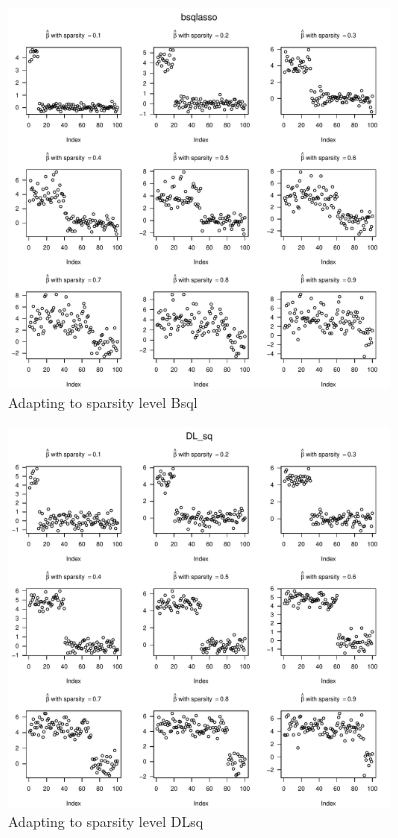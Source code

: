 \documentclass[chapters]{uamaththesis}
\begin{document}
\begin{figure}[!h]%
\centering
\includegraphics[width=0.9\textwidth , height = .8\textheight]{Sparsity_Bsql}%
\caption{Adapting to sparsity level Bsql }%
\end{figure}

\begin{figure}[!h]%
\centering
\includegraphics[width=0.9\textwidth , height = .8\textheight]{Sparsity_DL_sq}%
\caption{Adapting to sparsity level DLsq }%
\end{figure}
\end{document}
